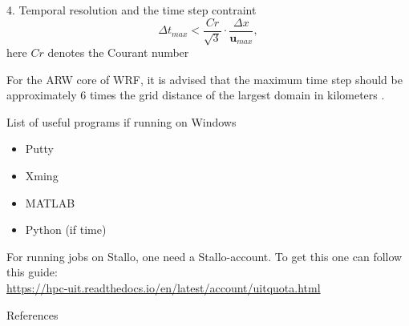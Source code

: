 \documentclass{beamer}
\newcommand{\ub}{\bm {u}\xspace}						%
\begin{document}
\begin{frame}[fragile,allowframebreaks=1, t]{4. Temporal resolution and the time step contraint}
\begin{equation}
\Delta t_{max} < \frac{Cr}{\sqrt{3}}\cdot\frac{\Delta x}{\ub_{max}},
\label{deltatmax}
\end{equation}
here $Cr$ denotes the Courant number

For the ARW core of WRF, it is advised that the maximum time step should be approximately 6 times the grid distance of the largest domain in kilometers \citep{skamarock2008description}.

\end{frame}

\begin{frame}{List of useful programs if running on Windows}
\begin{itemize}
	\item Putty
	\item Xming
	\item MATLAB
	\item Python (if time)	
\end{itemize}
For running jobs on Stallo, one need a Stallo-account. To get this one can follow this guide:\\
\url{https://hpc-uit.readthedocs.io/en/latest/account/uitquota.html}
\end{frame}

\begin{frame}[fragile,allowframebreaks=1, t]{References}


\end{frame}
\end{document}
